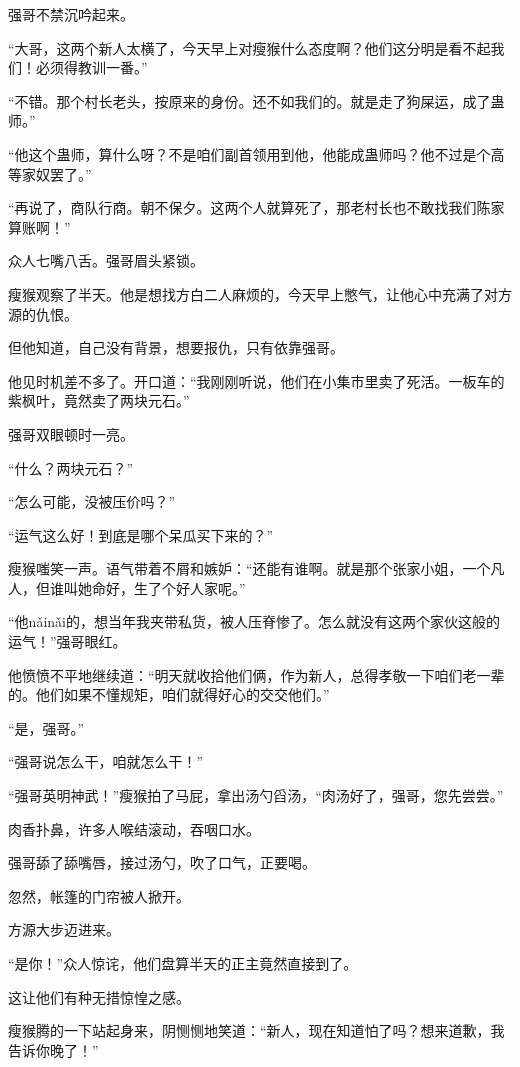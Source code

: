 \begin{this_body}
强哥不禁沉吟起来。

“大哥，这两个新人太横了，今天早上对瘦猴什么态度啊？他们这分明是看不起我们！必须得教训一番。”

“不错。那个村长老头，按原来的身份。还不如我们的。就是走了狗屎运，成了蛊师。”

“他这个蛊师，算什么呀？不是咱们副首领用到他，他能成蛊师吗？他不过是个高等家奴罢了。”

“再说了，商队行商。朝不保夕。这两个人就算死了，那老村长也不敢找我们陈家算账啊！”

众人七嘴八舌。强哥眉头紧锁。

瘦猴观察了半天。他是想找方白二人麻烦的，今天早上憋气，让他心中充满了对方源的仇恨。

但他知道，自己没有背景，想要报仇，只有依靠强哥。

他见时机差不多了。开口道：“我刚刚听说，他们在小集市里卖了死活。一板车的紫枫叶，竟然卖了两块元石。”

强哥双眼顿时一亮。

“什么？两块元石？”

“怎么可能，没被压价吗？”

“运气这么好！到底是哪个呆瓜买下来的？”

瘦猴嗤笑一声。语气带着不屑和嫉妒：“还能有谁啊。就是那个张家小姐，一个凡人，但谁叫她命好，生了个好人家呢。”

“他nǎinǎi的，想当年我夹带私货，被人压脊惨了。怎么就没有这两个家伙这般的运气！”强哥眼红。

他愤愤不平地继续道：“明天就收拾他们俩，作为新人，总得孝敬一下咱们老一辈的。他们如果不懂规矩，咱们就得好心的交交他们。”

“是，强哥。”

“强哥说怎么干，咱就怎么干！”

“强哥英明神武！”瘦猴拍了马屁，拿出汤勺舀汤，“肉汤好了，强哥，您先尝尝。”

肉香扑鼻，许多人喉结滚动，吞咽口水。

强哥舔了舔嘴唇，接过汤勺，吹了口气，正要喝。

忽然，帐篷的门帘被人掀开。

方源大步迈进来。

“是你！”众人惊诧，他们盘算半天的正主竟然直接到了。

这让他们有种无措惊惶之感。

瘦猴腾的一下站起身来，阴恻恻地笑道：“新人，现在知道怕了吗？想来道歉，我告诉你晚了！”


\end{this_body}
